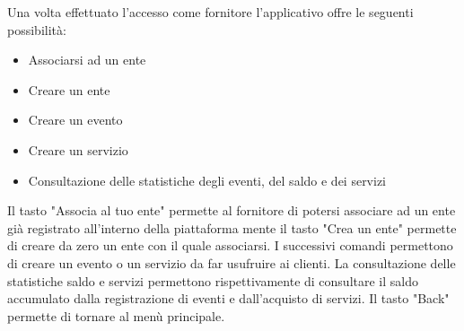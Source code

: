 Una volta effettuato l'accesso come fornitore l'applicativo offre le seguenti possibilità:
\begin{itemize}
    \item Associarsi ad un ente
    \item Creare un ente
    \item Creare un evento
    \item Creare un servizio
    \item Consultazione delle statistiche degli eventi, del saldo e dei servizi
\end{itemize}

Il tasto "Associa al tuo ente" permette al fornitore di potersi associare ad un ente già registrato all'interno della piattaforma mente il tasto "Crea un ente" permette di creare da zero un ente con il quale associarsi.
I successivi comandi permettono di creare un evento o un servizio da far usufruire ai clienti.
La consultazione delle statistiche saldo e servizi permettono rispettivamente di consultare il saldo accumulato dalla registrazione di eventi e dall'acquisto di servizi.
Il tasto "Back" permette di tornare al menù principale.